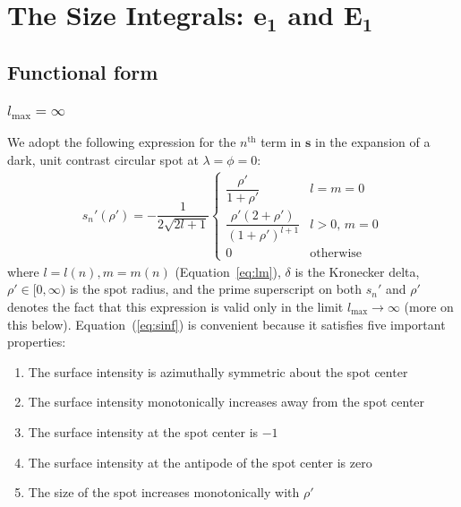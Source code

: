 \documentclass[modern]{aastex62}
\begin{document}
%
\section{The Size Integrals: \lowercase{$\mathbf{e_1}$} and $\mathbf{E_1}$}
\label{sec:size}
%
\subsection{Functional form}
%

\subsubsection{$l_{\mathrm{max}} = \infty$}
\label{sec:size-function}
%
We adopt the following expression for the $n^{\mathrm{th}}$ term in $\mathbf{s}$
in the expansion of a dark, unit contrast circular spot at
$\lambda = \phi = 0$:
%
\begin{align}
    \label{eq:sinf}
    s_{n}'(\rho') =
    -\dfrac{1}{2\sqrt{2l + 1}}
    \begin{cases}
        \dfrac{\rho'}{1 + \rho'}
         & l = m = 0
        \\[1em]
        \dfrac{\rho' \left( 2 + \rho' \right)}
        {(1 + \rho')^{l + 1}}
         & l > 0, \, m = 0
        \\[1em]
        0
         & \mathrm{otherwise}
    \end{cases}
\end{align}
%
where
$l = l(n), m = m(n)$ (Equation~\ref{eq:lm}),
$\delta$ is the Kronecker delta,
$\rho' \in [0, \infty)$ is the spot radius,
and the prime superscript on both $s_{n}'$ and $\rho'$ denotes
the fact that this expression
is valid only in the limit $l_{\mathrm{max}} \rightarrow \infty$
(more on this below).
Equation~(\ref{eq:sinf}) is convenient because it satisfies
five important properties:
%
\begin{enumerate}[itemsep=2pt,parsep=1pt,label=\textbf{\arabic*}]
    \item The surface intensity is azimuthally symmetric about the spot center
    \item The surface intensity monotonically increases away from the spot center
    \item The surface intensity at the spot center is $-1$
    \item The surface intensity at the antipode of the spot center is zero
    \item The size of the spot increases monotonically with $\rho'$
\end{enumerate}
\end{document}
